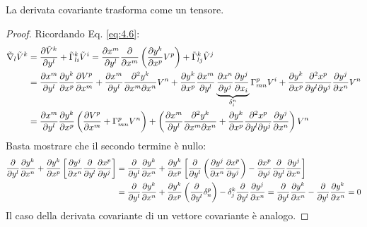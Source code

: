 \begin{proposition}
	La derivata covariante trasforma come un tensore.
\end{proposition}
\begin{proof}
	Ricordando Eq. \ref{eq:4.6}:
	\begin{equation*}
		\begin{split}
			\tilde{\nabla}_l \tilde{V}^k
			&= \frac{\partial \tilde{V}^k}{\partial y^l} + \tilde{\Gamma}^k_{li}\tilde{V}^i = \frac{\partial x^m}{\partial y^l} \frac{\partial}{\partial x^m} \left( \frac{\partial y^k}{\partial x^p} V^p \right) + \tilde{\Gamma}^k_{lj} \tilde{V}^j\\
			&= \frac{\partial x^m}{\partial y^l} \frac{\partial y^k}{\partial x^p} \frac{\partial V^p}{\partial x^m} + \frac{\partial x^m}{\partial y^l} \frac{\partial^2 y^k}{\partial x^m \partial x^n} V^n + \frac{\partial y^k}{\partial x^p} \frac{\partial x^m}{\partial y^l} \underbrace{\frac{\partial x^n}{\partial y^j} \frac{\partial y^j}{\partial x_i}}_{\delta^n_i} \Gamma^p_{mn} V^i + \frac{\partial y^k}{\partial x^p} \frac{\partial^2 x^p}{\partial y^l \partial y^j} \frac{\partial y^j}{\partial x^n} V^n\\
			&= \frac{\partial x^m}{\partial y^l} \frac{\partial y^k}{\partial x^p} \left( \frac{\partial V^p}{\partial x^m} + \Gamma^p_{mn} V^n \right) + \left( \frac{\partial x^m}{\partial y^l} \frac{\partial^2 y^k}{\partial x^m \partial x^n} + \frac{\partial y^k}{\partial x^p} \frac{\partial^2 x^p}{\partial y^l \partial y^j} \frac{\partial y^j}{\partial x^n} \right) V^n
		\end{split}
	\end{equation*}
	Basta mostrare che il secondo termine è nullo:
	\begin{equation*}
		\begin{split}
			\frac{\partial}{\partial y^l} \frac{\partial y^k}{\partial x^n} + \frac{\partial y^k}{\partial x^p} \left[ \frac{\partial y^j}{\partial x^n} \frac{\partial}{\partial y^l} \frac{\partial x^p}{\partial y^j} \right]
			&= \frac{\partial}{\partial y^l} \frac{\partial y^k}{\partial x^n} + \frac{\partial y^k}{\partial x^p} \left[ \frac{\partial}{\partial y^l} \left( \frac{\partial y^j}{\partial x^n} \frac{\partial x^p}{\partial y^j} \right) - \frac{\partial x^p}{\partial y^j} \frac{\partial}{\partial y^l} \frac{\partial y^j}{\partial x^n} \right]\\
			&= \frac{\partial}{\partial y^l} \frac{\partial y^k}{\partial x^n} + \frac{\partial y^k}{\partial x^p} \left( \frac{\partial}{\partial y^l} \delta^p_n \right) - \delta^k_j \frac{\partial}{\partial y^l} \frac{\partial y^j}{\partial x^n} = \frac{\partial}{\partial y^l} \frac{\partial y^k}{\partial x^n} - \frac{\partial}{\partial y^l} \frac{\partial y^k}{\partial x^n} = 0
		\end{split}
	\end{equation*}
	Il caso della derivata covariante di un vettore covariante è analogo.
\end{proof}

